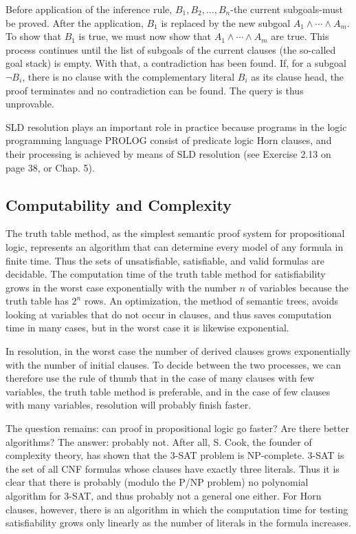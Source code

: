 \documentclass[10pt]{book}
\begin{document}
Before application of the inference rule, $B_{1}, B_{2}, \ldots, B_{n}$-the current subgoals-must be proved. After the application, $B_{1}$ is replaced by the new subgoal $A_{1} \wedge \cdots \wedge A_{m}$. To show that $B_{1}$ is true, we must now show that $A_{1} \wedge \cdots \wedge A_{m}$ are true. This process continues until the list of subgoals of the current clauses (the so-called goal stack) is empty. With that, a contradiction has been found. If, for a subgoal $\neg B_{i}$, there is no clause with the complementary literal $B_{i}$ as its clause head, the proof terminates and no contradiction can be found. The query is thus unprovable.

SLD resolution plays an important role in practice because programs in the logic programming language PROLOG consist of predicate logic Horn clauses, and their processing is achieved by means of SLD resolution (see Exercise 2.13 on page 38, or Chap. 5).

\subsection{Computability and Complexity}
The truth table method, as the simplest semantic proof system for propositional logic, represents an algorithm that can determine every model of any formula in finite time. Thus the sets of unsatisfiable, satisfiable, and valid formulas are decidable. The computation time of the truth table method for satisfiability grows in the worst case exponentially with the number $n$ of variables because the truth table has $2^{n}$ rows. An optimization, the method of semantic trees, avoids looking at variables that do not occur in clauses, and thus saves computation time in many cases, but in the worst case it is likewise exponential.

In resolution, in the worst case the number of derived clauses grows exponentially with the number of initial clauses. To decide between the two processes, we can therefore use the rule of thumb that in the case of many clauses with few variables, the truth table method is preferable, and in the case of few clauses with many variables, resolution will probably finish faster.

The question remains: can proof in propositional logic go faster? Are there better algorithms? The answer: probably not. After all, S. Cook, the founder of complexity theory, has shown that the 3-SAT problem is NP-complete. 3-SAT is the set of all CNF formulas whose clauses have exactly three literals. Thus it is clear that there is probably (modulo the P/NP problem) no polynomial algorithm for 3-SAT, and thus probably not a general one either. For Horn clauses, however, there is an algorithm in which the computation time for testing satisfiability grows only linearly as the number of literals in the formula increases.
\end{document}

